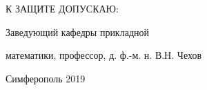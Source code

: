\begin{titlepage}
   К ЗАЩИТЕ ДОПУСКАЮ:
   
   Заведующий кафедры прикладной 
   
   математики, профессор, д. ф.-м. н. \hspace*{2.4cm} В.Н. Чехов
    
    
    
    
    \vspace{\fill}

    \begin{center}
    Симферополь 2019
    \end{center}

    \end{titlepage}